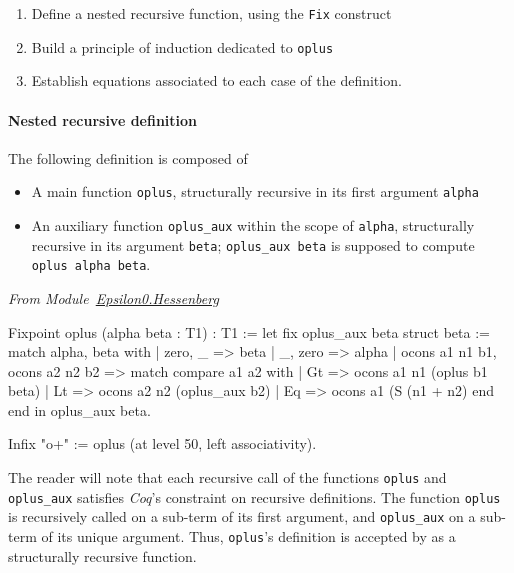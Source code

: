     \begin{enumerate}
    \item Define a nested recursive function, using the \texttt{Fix} 
        construct

    \item Build a principle of induction dedicated to \texttt{oplus}

    \item Establish equations associated to each case of the definition.
    \end{enumerate}

    \paragraph{Nested recursive definition}
    \label{sec:orgheadline83}

    The following definition is composed of 
    \begin{itemize}
    \item A main function \texttt{oplus}, structurally recursive in its 
    first argument \texttt{alpha}
    \item An auxiliary function \texttt{oplus\_aux} within the scope of \texttt{alpha},
    structurally recursive in its argument \texttt{beta};  \texttt{oplus\_aux beta} 
       is supposed to compute  \texttt{oplus alpha beta}.
    \end{itemize}
      
    \vspace{4pt}
    \emph{From Module~\href{../theories/html/hydras.Epsilon0.Hessenberg.html\#oplus}{Epsilon0.Hessenberg}}

    \label{sect:infix-oplus}

    \begin{Coqsrc}
    Fixpoint oplus (alpha beta : T1) : T1 :=
      let fix oplus_aux beta {struct beta} :=
          match alpha, beta with
            | zero, _ => beta
            | _,  zero => alpha
            | ocons a1 n1 b1, ocons a2 n2 b2 =>
              match compare a1 a2 with
                |  Gt => ocons a1 n1 (oplus b1 beta)
                |  Lt => ocons a2 n2 (oplus_aux b2)
                |  Eq => ocons a1 (S (n1 + n2)%
              end
          end
      in oplus_aux beta.

    Infix "o+" := oplus  (at level 50, left associativity).
    \end{Coqsrc}


    The reader will note that each recursive call of the functions
    \texttt{oplus} and \texttt{oplus\_aux} satisfies \emph{Coq}'s constraint
    on recursive definitions. The function \texttt{oplus} is recursively called on a sub-term of its first argument,
    and \texttt{oplus\_aux} on a sub-term of its unique argument.
    Thus, \texttt{oplus}'s definition is accepted by \coq{} as a structurally recursive function.

